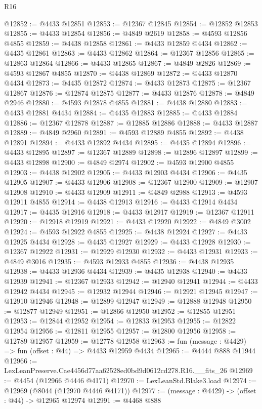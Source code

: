 \begin{lexlean}{R16}
\begin{coremodule}
@12852 := @4433 @12851
@12853 := @12367 @12845
@12854 := @12852 @12853
@12855 := @4433 @12854
@12856 := @4849 @2619
@12858 := @4593 @12856 @4855
@12859 := @4438 @12858
@12861 := @4433 @12859 @4434
@12862 := @4435 @12861
@12863 := @4433 @12862
@12864 := @12367 @12856
@12865 := @12863 @12864
@12866 := @4433 @12865
@12867 := @4849 @2826
@12869 := @4593 @12867 @4855
@12870 := @4438 @12869
@12872 := @4433 @12870 @4434
@12873 := @4435 @12872
@12874 := @4433 @12873
@12875 := @12367 @12867
@12876 := @12874 @12875
@12877 := @4433 @12876
@12878 := @4849 @2946
@12880 := @4593 @12878 @4855
@12881 := @4438 @12880
@12883 := @4433 @12881 @4434
@12884 := @4435 @12883
@12885 := @4433 @12884
@12886 := @12367 @12878
@12887 := @12885 @12886
@12888 := @4433 @12887
@12889 := @4849 @2960
@12891 := @4593 @12889 @4855
@12892 := @4438 @12891
@12894 := @4433 @12892 @4434
@12895 := @4435 @12894
@12896 := @4433 @12895
@12897 := @12367 @12889
@12898 := @12896 @12897
@12899 := @4433 @12898
@12900 := @4849 @2974
@12902 := @4593 @12900 @4855
@12903 := @4438 @12902
@12905 := @4433 @12903 @4434
@12906 := @4435 @12905
@12907 := @4433 @12906
@12908 := @12367 @12900
@12909 := @12907 @12908
@12910 := @4433 @12909
@12911 := @4849 @2988
@12913 := @4593 @12911 @4855
@12914 := @4438 @12913
@12916 := @4433 @12914 @4434
@12917 := @4435 @12916
@12918 := @4433 @12917
@12919 := @12367 @12911
@12920 := @12918 @12919
@12921 := @4433 @12920
@12922 := @4849 @3002
@12924 := @4593 @12922 @4855
@12925 := @4438 @12924
@12927 := @4433 @12925 @4434
@12928 := @4435 @12927
@12929 := @4433 @12928
@12930 := @12367 @12922
@12931 := @12929 @12930
@12932 := @4433 @12931
@12933 := @4849 @3016
@12935 := @4593 @12933 @4855
@12936 := @4438 @12935
@12938 := @4433 @12936 @4434
@12939 := @4435 @12938
@12940 := @4433 @12939
@12941 := @12367 @12933
@12942 := @12940 @12941
@12944 := @4433 @12942 @4434
@12945 := @12932 @12944
@12946 := @12921 @12945
@12947 := @12910 @12946
@12948 := @12899 @12947
@12949 := @12888 @12948
@12950 := @12877 @12949
@12951 := @12866 @12950
@12952 := @12855 @12951
@12953 := @12844 @12952
@12954 := @12833 @12953
@12955 := @12822 @12954
@12956 := @12811 @12955
@12957 := @12800 @12956
@12958 := @12789 @12957
@12959 := @12778 @12958
@12963 := fun (message : @4429) => fun (offset : @44) => @4433 @12959 @4434
@12965 := @4444 @888 @11944
@12966 := LexLeanPreserve.Cae4456d77aa62528ed0bd9d0612cd278.R16.__fits_26
@12969 := @4454 (@12966 @4446 @4171)
@12970 := LexLeanStd.Blake3.load
@12974 := @12969 (@8044 (@12970 @4446 @4171))
@12977 := (message : @4429) -> (offset : @44) -> @12965 @12974
@12991 := @4468
    @888

\end{coremodule}
\end{lexlean}
